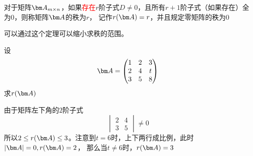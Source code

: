 \begin{definition}
    对于矩阵$\mat{A}_{m\times n}$，如果\textcolor{red}{存在}$r$阶子式$D\neq 0$，且所有$r+1$阶子式（如果存在）全为$0$，则称矩阵$\mat{A}$的秩为$r$，
    记作$r(\mat{A})=r$，并且规定零矩阵的秩为$0$
\end{definition}
可以通过这个定理可以缩小求秩的范围。
\begin{example}
    设
    \[
        \mat{A} =
        \begin{pmatrix}
            1 & 2 & 3 \\
            2 & 4 & t \\
            3 & 5 & 8
        \end{pmatrix}
    \]
    求$r(\mat{A})$
\end{example}
\begin{solution}
    由于矩阵左下角的$2$阶子式
    \[
        \begin{vmatrix}
            2 & 4 \\
            3 & 5
        \end{vmatrix}
        \neq 0
    \]
    所以$2\leq r(\mat{A}) \leq 3$。注意到$t=6$时，上下两行成比例，此时$|\mat{A}|=0,r(\mat{A})=2$，
    那么当$t\neq 6$时，$r(\mat{A})=3$
\end{solution}

